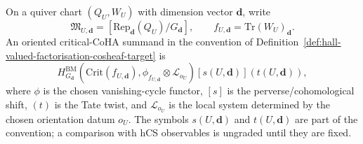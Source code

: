 \begin{definition}
\label{def:local-critical-coha-normalisation}
On a quiver chart $(Q_U,W_U)$ with dimension vector $\mathbf d$, write
\[
 \mathfrak M_{U,\mathbf d}
 =
 [\mathrm{Rep}_{\mathbf d}(Q_U)/G_{\mathbf d}],
 \qquad
 f_{U,\mathbf d}=\mathrm{Tr}(W_U)_{\mathbf d}.
\]
An oriented critical-CoHA summand in the convention of
Definition~\ref{def:hall-valued-factorisation-cosheaf-target} is
\[
 H^{\mathrm{BM}}_{G_{\mathbf d}}
 \!\left(
 \mathrm{Crit}(f_{U,\mathbf d}),
 \phi_{f_{U,\mathbf d}}\otimes\mathscr L_{o_U}
 \right)
 [s(U,\mathbf d)](t(U,\mathbf d)),
\]
where $\phi$ is the chosen vanishing-cycle functor, $[s]$ is the
perverse/cohomological shift, $(t)$ is the Tate twist, and
$\mathscr L_{o_U}$ is the local system determined by the chosen
orientation datum $o_U$. The symbols $s(U,\mathbf d)$ and
$t(U,\mathbf d)$ are part of the convention; a comparison with hCS
observables is ungraded until they are fixed.
\end{definition}

